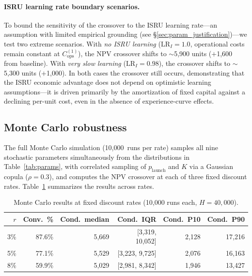 \documentclass[preprint,12pt]{elsarticle}
\begin{document}
\paragraph{ISRU learning rate boundary scenarios.} To bound the sensitivity of the crossover to the ISRU learning rate---an assumption with limited empirical grounding (see \S\ref{sec:param_justification})---we test two extreme scenarios. With \emph{no ISRU learning} ($\mathrm{LR}_I = 1.0$, operational costs remain constant at $C_{\mathrm{ops}}^{(1)}$), the NPV crossover shifts to $\sim$5{,}900 units ($+$1{,}600 from baseline). With \emph{very slow learning} ($\mathrm{LR}_I = 0.98$), the crossover shifts to $\sim$5{,}300 units ($+$1{,}000). In both cases the crossover still occurs, demonstrating that the ISRU economic advantage does not depend on optimistic learning assumptions---it is driven primarily by the amortization of fixed capital against a declining per-unit cost, even in the absence of experience-curve effects.

\subsection{Monte Carlo robustness}
\label{sec:mc_robustness}

The full Monte Carlo simulation (10{,}000~runs per rate) samples all nine stochastic parameters simultaneously from the distributions in Table~\ref{tab:params}, with correlated sampling of $p_{\mathrm{launch}}$ and $K$ via a Gaussian copula ($\rho = 0.3$), and computes the NPV crossover at each of three fixed discount rates. Table~\ref{tab:mc_summary} summarizes the results across rates.

\begin{table}[htbp]
\centering
\caption{Monte Carlo results at fixed discount rates (10{,}000 runs each, $H = 40{,}000$).}
\label{tab:mc_summary}
\small
\begin{tabular}{@{}rrrrrr@{}}
\toprule
$r$ & Conv.\ \% & Cond.\ median & Cond.\ IQR & Cond.\ P10 & Cond.\ P90 \\
\midrule
3\%  & 87.6\% & 5{,}669 & [3{,}319, 10{,}052] & 2{,}128 & 17{,}216 \\
5\%  & 77.1\% & 5{,}529 & [3{,}223, 9{,}725]  & 2{,}076 & 16{,}163 \\
8\%  & 59.9\% & 5{,}029 & [2{,}981, 8{,}342]  & 1{,}946 & 13{,}427 \\
\bottomrule
\end{tabular}
\end{table}
\end{document}

